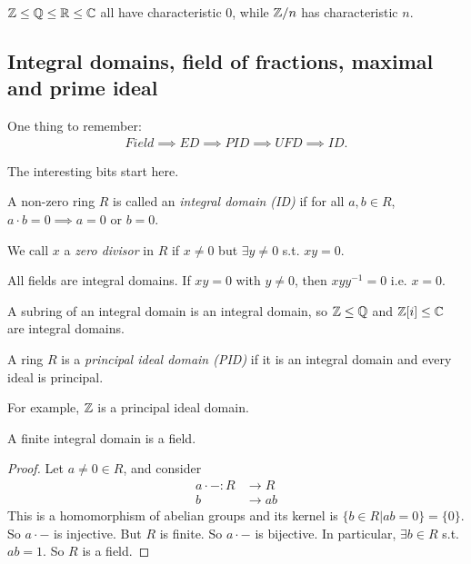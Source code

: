 \documentclass[a4paper]{article}
\begin{document}
\begin{eg}
$\mathbb{Z} \leq \mathbb{Q} \leq \mathbb{R} \leq \mathbb{C}$ all have characteristic $0$, while $\mathbb{Z}/n$ has characteristic $n$.
\end{eg}

\subsection{Integral domains, field of fractions, maximal and prime ideal}
One thing to remember:
\begin{equation*}
\begin{aligned}
Field \implies ED \implies PID \implies UFD \implies ID.
\end{aligned}
\end{equation*}

The interesting bits start here.

\begin{defi}
A non-zero ring $R$ is called an \emph{integral domain (ID)} if for all $a,b \in R$, $a \cdot b = 0 \implies a=0$ or $b=0$.

We call $x$ a \emph{zero divisor} in $R$ if $x\neq 0$ but $\exists y \neq 0$ s.t. $xy = 0$.
\end{defi}

\begin{eg}
All fields are integral domains. If $xy=0$ with $y \neq 0$, then $xyy^{-1} = 0$ i.e. $x=0$.

A subring of an integral domain is an integral domain, so $\mathbb{Z} \leq \mathbb{Q}$ and $\mathbb{Z}[i] \leq \mathbb{C}$ are integral domains.
\end{eg}

\begin{defi}
A ring $R$ is a \emph{principal ideal domain (PID)} if it is an integral domain and every ideal is principal.
\end{defi}

For example, $\mathbb{Z}$ is a principal ideal domain.

\begin{lemma}
A finite integral domain is a field.
\begin{proof}
Let $a \neq 0 \in R$, and consider
\begin{equation*}
\begin{aligned}
a \cdot -: R &\to R\\
b &\to ab
\end{aligned}
\end{equation*}
This is a homomorphism of abelian groups and its kernel is $\{b \in R | ab=0\} = \{0\}$. So $a\cdot -$ is injective. But $R$ is finite. So $a \cdot -$ is bijective. In particular, $\exists b \in R$ s.t. $ab=1$. So $R$ is a field.
\end{proof}
\end{lemma}
\end{document}
